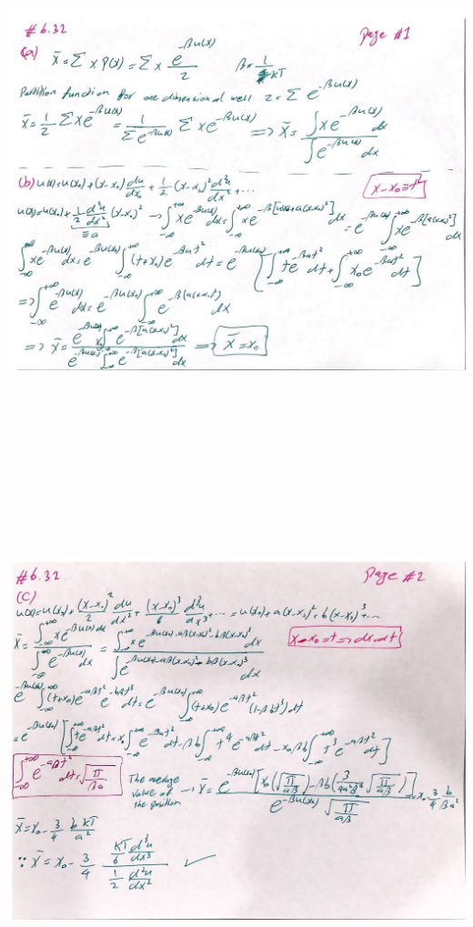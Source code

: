 \documentclass[fleqn]{article}
\begin{document}
\begin{enumerate}
      \begin{center}
        \includegraphics[height=16cm, width=16cm]{632A.JPG}
      \end{center}
      \pagebreak
      \begin{center}
        \includegraphics[height=15cm, width=16cm]{632B.JPG}

\end{center}
\end{enumerate}
\end{document}
